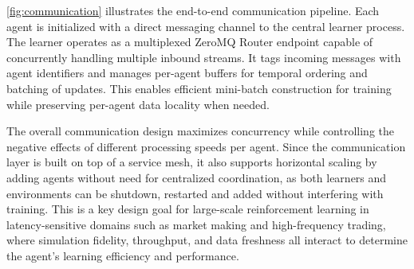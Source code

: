 \documentclass[11pt]{article}
\begin{document}
    \autoref{fig:communication} illustrates the end-to-end communication pipeline.
    Each agent is initialized with a direct messaging channel to the central learner process.
    The learner operates as a multiplexed ZeroMQ Router endpoint capable of concurrently handling multiple inbound streams.
    It tags incoming messages with agent identifiers and manages per-agent buffers for temporal ordering and batching of updates.
    This enables efficient mini-batch construction for training while preserving per-agent data locality when needed.

    The overall communication design maximizes concurrency while controlling the negative effects of different processing speeds per agent.
    Since the communication layer is built on top of a service mesh,
    it also supports horizontal scaling by adding agents without need for centralized coordination,
    as both learners and environments can be shutdown, restarted and added without interfering with training.
    This is a key design goal for large-scale reinforcement learning in latency-sensitive domains such as market making and high-frequency trading,
    where simulation fidelity, throughput, and data freshness all interact to determine the agent’s learning efficiency and performance.
\end{document}
